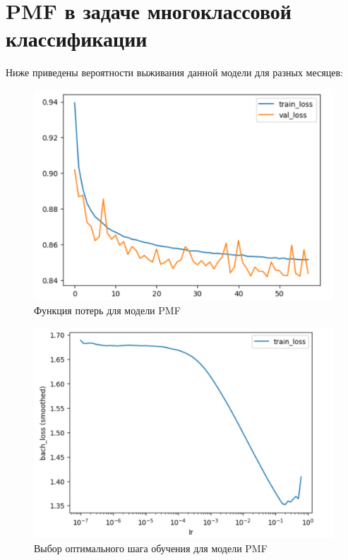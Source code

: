 \documentclass[a4paper,14pt,oneside,openany]{memoir}
\begin{document}
\section{PMF в задаче многоклассовой классификации}

Ниже приведены вероятности выживания данной модели для разных месяцев: 

\begin{figure}[H]
	\includegraphics[width=\textwidth]{../figures/pmf_losses_30_epoch.png}
	\caption{Функция потерь для модели PMF}
\end{figure}

\begin{figure}[H]
	\includegraphics[width=\textwidth]{../figures/pmf_losses_30_epoch_lr.png}
	\caption{Выбор оптимального шага обучения для модели PMF}
\end{figure}
\end{document}
